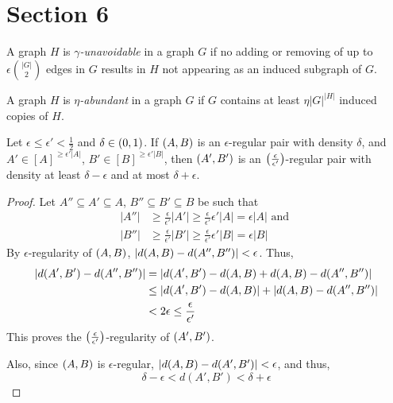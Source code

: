 \section{Section 6} \label{sec:section_6}
    \begin{definition} \label{def:unavoidable}
        A graph $H$ is \emph{$\gamma$-unavoidable} in a graph $G$ if no adding or removing of up to $\epsilon {|G| \choose 2}$
        edges in $G$ results in $H$ not appearing as an induced subgraph of $G$.
    \end{definition}

    \begin{definition} \label{def:abundant}
        A graph $H$ is \emph{$\eta$-abundant} in a graph $G$ if $G$ contains at least $\eta |G|^{|H|}$
        induced copies of $H$.
    \end{definition}

    \begin{lemma} \label{lem:regularity_is_transitive}
        Let $\epsilon \leq \epsilon' < \frac{1}{2}$ and $\delta \in \left( 0, 1 \right)$.
        If $\left( A,B \right)$ is an $\epsilon$-regular pair with density $\delta$, and $A' \in [A]^{\geq \epsilon' |A|}$,
        $B' \in [B]^{\geq \epsilon' |B|}$, then $\left( A', B' \right)$ is an $\left( \frac{\epsilon}{\epsilon'} \right)$-regular
        pair with density at least $\delta - \epsilon$ and at most $\delta + \epsilon$.
        \begin{proof}
            Let $A'' \subseteq A' \subseteq A$, $B'' \subseteq B' \subseteq B$ be such that
            \begin{align*}
                |A''| & \geq \frac{\epsilon}{\epsilon'} |A'| \geq \frac{\epsilon}{\epsilon'} \epsilon' |A| = \epsilon |A|
                \text{ and } \\
                |B''| & \geq \frac{\epsilon}{\epsilon'} |B'| \geq \frac{\epsilon}{\epsilon'} \epsilon' |B| = \epsilon |B|
            \end{align*}
            By $\epsilon$-regularity of $\left( A,B \right)$, $\left| d(A,B) - d(A'',B'') \right| < \epsilon$.
            Thus,
            \begin{align*}
                \left| d(A',B') - d(A'',B'') \right|
                    & = \left| d(A',B') - d(A,B) + d(A,B) - d(A'',B'') \right| \\
                    & \leq \left| d(A',B') - d(A,B) \right| + \left| d(A,B) - d(A'',B'') \right| \\
                    & < 2 \epsilon \leq \frac{\epsilon}{\epsilon'}
            \end{align*}
            This proves the $\left( \frac{\epsilon}{\epsilon'} \right)$-regularity of $\left( A',B' \right)$.

            Also, since $\left( A,B \right)$ is $\epsilon$-regular, $\left| d(A,B) - d(A',B') \right| < \epsilon$,
            and thus,
            \[
                \delta - \epsilon < d(A',B') < \delta + \epsilon
            \]
        \end{proof}
    \end{lemma}


